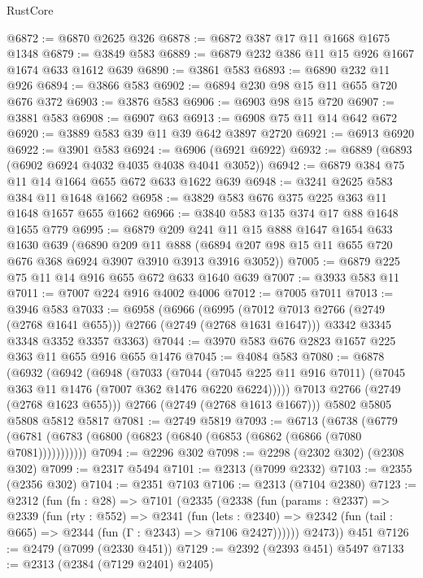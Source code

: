 \begin{lexlean}{RustCore}
\begin{coremodule}
@6872 := @6870 @2625 @326
@6878 := @6872 @387 @17 @11 @1668 @1675 @1348
@6879 := @3849 @583
@6889 := @6879 @232 @386 @11 @15 @926 @1667 @1674 @633 @1612 @639
@6890 := @3861 @583
@6893 := @6890 @232 @11 @926
@6894 := @3866 @583
@6902 := @6894 @230 @98 @15 @11 @655 @720 @676 @372
@6903 := @3876 @583
@6906 := @6903 @98 @15 @720
@6907 := @3881 @583
@6908 := @6907 @63
@6913 := @6908 @75 @11 @14 @642 @672
@6920 := @3889 @583 @39 @11 @39 @642 @3897 @2720
@6921 := @6913 @6920
@6922 := @3901 @583
@6924 := @6906 (@6921 @6922)
@6932 := @6889 (@6893 (@6902 @6924 @4032 @4035 @4038 @4041 @3052))
@6942 := @6879 @384 @75 @11 @14 @1664 @655 @672 @633 @1622 @639
@6948 := @3241 @2625 @583 @384 @11 @1648 @1662
@6958 := @3829 @583 @676 @375 @225 @363 @11 @1648 @1657 @655 @1662
@6966 := @3840 @583 @135 @374 @17 @88 @1648 @1655 @779
@6995 := @6879
    @209
    @241
    @11
    @15
    @888
    @1647
    @1654
    @633
    @1630
    @639
    (@6890
      @209
      @11
      @888
      (@6894 @207 @98 @15 @11 @655 @720 @676 @368 @6924 @3907 @3910 @3913 @3916 @3052))
@7005 := @6879 @225 @75 @11 @14 @916 @655 @672 @633 @1640 @639
@7007 := @3933 @583 @11
@7011 := @7007 @224 @916 @4002 @4006
@7012 := @7005 @7011
@7013 := @3946 @583
@7033 := @6958
    (@6966
      (@6995 (@7012 @7013 @2766 (@2749 (@2768 @1641 @655))) @2766 (@2749 (@2768 @1631 @1647)))
      @3342
      @3345
      @3348
      @3352
      @3357
      @3363)
@7044 := @3970 @583 @676 @2823 @1657 @225 @363 @11 @655 @916 @655 @1476
@7045 := @4084 @583
@7080 := @6878
    (@6932
      (@6942
        (@6948
          (@7033
            (@7044
              (@7045 @225 @11 @916 @7011)
              (@7045 @363 @11 @1476 (@7007 @362 @1476 @6220 @6224)))))
        @7013
        @2766
        (@2749 (@2768 @1623 @655)))
      @2766
      (@2749 (@2768 @1613 @1667)))
    @5802
    @5805
    @5808
    @5812
    @5817
@7081 := @2749 @5819
@7093 := @6713
    (@6738 (@6779 (@6781 (@6783 (@6800 (@6823 (@6840 (@6853 (@6862 (@6866 (@7080 @7081)))))))))))
@7094 := @2296 @302
@7098 := @2298 (@2302 @302) (@2308 @302)
@7099 := @2317 @5494
@7101 := @2313 (@7099 @2332)
@7103 := @2355 (@2356 @302)
@7104 := @2351 @7103
@7106 := @2313 (@7104 @2380)
@7123 := @2312
    (fun (fn : @28) =>
    @7101
      (@2335
        (@2338
          (fun (params : @2337) =>
          @2339
            (fun (rty : @552) =>
            @2341
              (fun (lets : @2340) =>
              @2342 (fun (tail : @665) => @2344 (fun (Γ : @2343) => @7106 @2427))))))
        @2473))
    @451
@7126 := @2479 (@7099 (@2330 @451))
@7129 := @2392 (@2393 @451) @5497
@7133 := @2313 (@2384 (@7129 @2401) @2405)

\end{coremodule}
\end{lexlean}
